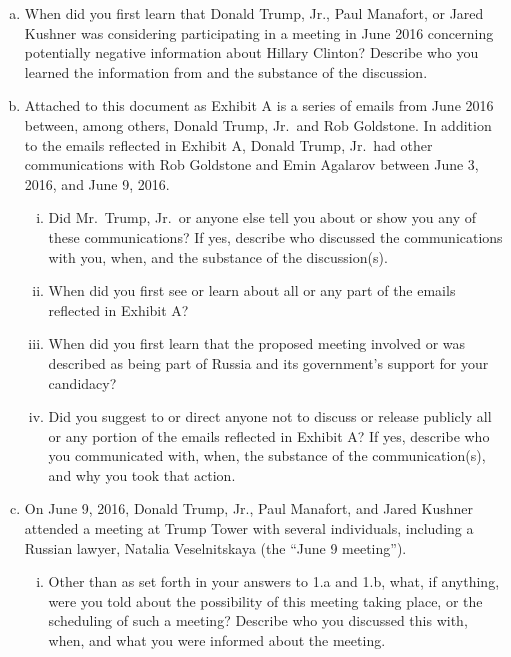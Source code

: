 \begin{enumerate}[a.]

\item When did you first learn that Donald Trump, Jr., Paul Manafort, or Jared Kushner was considering participating in a meeting in June 2016 concerning potentially negative information about Hillary Clinton?
Describe who you learned the information from and the substance of the discussion.

\item Attached to this document as Exhibit A is a series of emails from June 2016 between, among others, Donald Trump, Jr.\ and Rob Goldstone.
In addition to the emails reflected in Exhibit A, Donald Trump, Jr.\ had other communications with Rob Goldstone and Emin Agalarov between June 3, 2016, and June 9, 2016.

\begin{enumerate}[i.]

\item Did Mr.~Trump, Jr.\ or anyone else tell you about or show you any of these communications?
If yes, describe who discussed the communications with you, when, and the substance of the discussion(s).

\item When did you first see or learn about all or any part of the emails reflected in Exhibit A?

\item When did you first learn that the proposed meeting involved or was described as being part of Russia and its government’s support for your candidacy?

\item Did you suggest to or direct anyone not to discuss or release publicly all or any portion of the emails reflected in Exhibit A? If yes, describe who you communicated with, when, the substance of the communication(s), and why you took that action.

\end{enumerate}

\item On June 9, 2016, Donald Trump, Jr., Paul Manafort, and Jared Kushner attended a meeting at Trump Tower with several individuals, including a Russian lawyer, Natalia Veselnitskaya (the “June 9 meeting”).

\begin{enumerate}[i.]

\item Other than as set forth in your answers to 1.a and 1.b, what, if anything, were you told about the possibility of this meeting taking place, or the scheduling of such a meeting?
Describe who you discussed this with, when, and what you were informed about the meeting.


\end{enumerate}
\end{enumerate}
